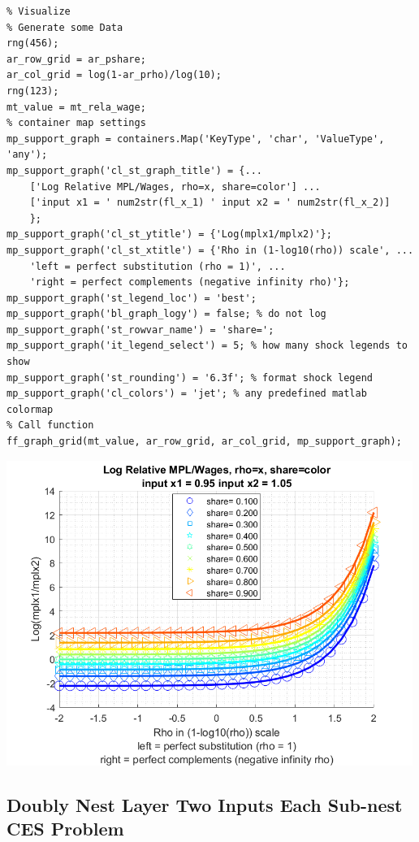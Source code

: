 \documentclass[
]{book}
\begin{document}
\begin{verbatim}
% Visualize
% Generate some Data
rng(456);
ar_row_grid = ar_pshare;
ar_col_grid = log(1-ar_prho)/log(10);
rng(123);
mt_value = mt_rela_wage;
% container map settings
mp_support_graph = containers.Map('KeyType', 'char', 'ValueType', 'any');
mp_support_graph('cl_st_graph_title') = {...
    ['Log Relative MPL/Wages, rho=x, share=color'] ...
    ['input x1 = ' num2str(fl_x_1) ' input x2 = ' num2str(fl_x_2)]
    };
mp_support_graph('cl_st_ytitle') = {'Log(mplx1/mplx2)'};
mp_support_graph('cl_st_xtitle') = {'Rho in (1-log10(rho)) scale', ...
    'left = perfect substitution (rho = 1)', ...
    'right = perfect complements (negative infinity rho)'};
mp_support_graph('st_legend_loc') = 'best';
mp_support_graph('bl_graph_logy') = false; % do not log
mp_support_graph('st_rowvar_name') = 'share=';
mp_support_graph('it_legend_select') = 5; % how many shock legends to show
mp_support_graph('st_rounding') = '6.3f'; % format shock legend
mp_support_graph('cl_colors') = 'jet'; % any predefined matlab colormap
% Call function
ff_graph_grid(mt_value, ar_row_grid, ar_col_grid, mp_support_graph);
\end{verbatim}

\includegraphics[width=5.20833in,height=\textheight]{img/bfwx_crs_nested_ces_mpl_images/figure_0.png}

\hypertarget{doubly-nest-layer-two-inputs-each-sub-nest-ces-problem}{%
\subsection{Doubly Nest Layer Two Inputs Each Sub-nest CES Problem}\label{doubly-nest-layer-two-inputs-each-sub-nest-ces-problem}}
\end{document}
